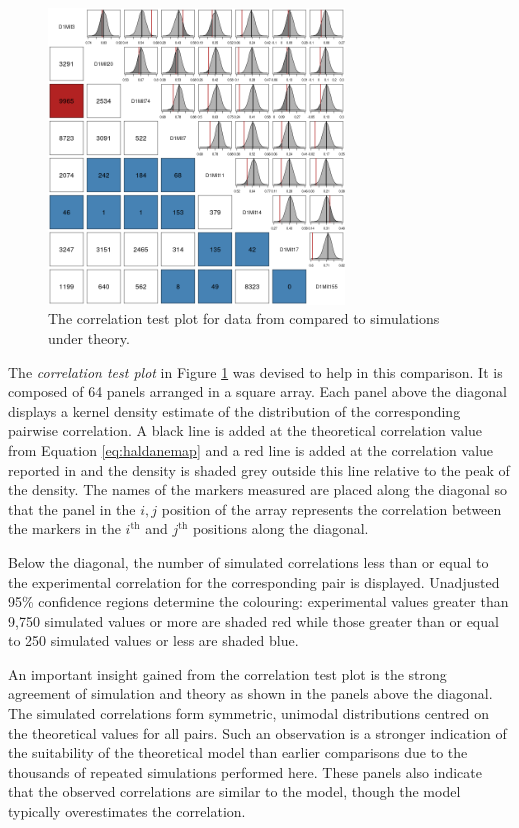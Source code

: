 \documentclass{article}
\begin{document}
\begin{figure}[htp]
  \begin{center}
      \includegraphics[width = 0.7\textwidth]{./img/chevCorrTest.png}
  \end{center}
  \caption{The correlation test plot for data from \cite{cheverudetal2001} compared to simulations under theory.}
  \label{fig:corrTestPlot}
\end{figure}

The \emph{correlation test plot} in Figure \ref{fig:corrTestPlot} was devised to help in this comparison. It is composed of 64 panels arranged in a square array. Each panel above the diagonal displays a kernel density estimate of the distribution of the corresponding pairwise correlation. A black line is added at the theoretical correlation value from Equation \ref{eq:haldanemap} and a red line is added at the correlation value reported in \cite{cheverud2001} and the density is shaded grey outside this line relative to the peak of the density. The names of the markers measured are placed along the diagonal so that the panel in the $i, j$ position of the array represents the correlation between the markers in the $i^{\text{th}}$ and $j^{\text{th}}$ positions along the diagonal.

Below the diagonal, the number of simulated correlations less than or equal to the experimental correlation for the corresponding pair is displayed. Unadjusted 95\% confidence regions determine the colouring: experimental values greater than 9,750 simulated values or more are shaded red while those greater than or equal to 250 simulated values or less are shaded blue.

An important insight gained from the correlation test plot is the strong agreement of simulation and theory as shown in the panels above the diagonal. The simulated correlations form symmetric, unimodal distributions centred on the theoretical values for all pairs. Such an observation is a stronger indication of the suitability of the theoretical model than earlier comparisons due to the thousands of repeated simulations performed here. These panels also indicate that the observed correlations are similar to the model, though the model typically overestimates the correlation.
\end{document}
